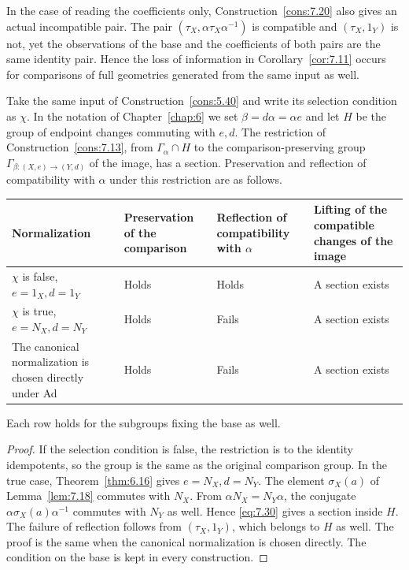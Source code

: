 In the case of reading the coefficients only, Construction~\ref{cons:7.20} also gives an
actual incompatible pair.
The pair $(\tau_X,\alpha\tau_X\alpha^{-1})$ is compatible and $(\tau_X,1_Y)$ is not, yet the
observations of the base and the coefficients of both pairs are the same identity pair.
Hence the loss of information in Corollary~\ref{cor:7.11} occurs for comparisons of full
geometries generated from the same input as well.

\begin{corollary}\label{cor:7.22}

Take the same input of Construction~\ref{cons:5.40} and write its selection condition as $\chi$.
In the notation of Chapter~\ref{chap:6} we set $\beta=d\alpha=\alpha e$ and let $H$ be the
group of endpoint changes commuting with $e,d$.
The restriction of Construction~\ref{cons:7.13}, from $\Gamma_\alpha\cap H$ to
the comparison-preserving group $\Gamma_{\beta:(X,e)\to(Y,d)}$ of the image, has a
section.
Preservation and reflection of compatibility with $\alpha$ under this restriction are as
follows.

\begin{xltabular}{\linewidth}{@{}LLLL@{}}
\toprule
Normalization & Preservation of the comparison & Reflection of compatibility with $\alpha$ &
Lifting of the compatible changes of the image \\
\midrule
\endhead
$\chi$ is false, $e=1_X,d=1_Y$ & Holds & Holds & A section exists \\
\addlinespace[3pt]
$\chi$ is true, $e=N_X,d=N_Y$ & Holds & Fails & A section exists \\
\addlinespace[3pt]
The canonical normalization is chosen directly under Ad & Holds & Fails & A section exists \\
\bottomrule
\end{xltabular}

Each row holds for the subgroups fixing the base as well.

\end{corollary}

\begin{proof}

If the selection condition is false, the restriction is to the identity idempotents, so the
group is the same as the original comparison group.
In the true case, Theorem~\ref{thm:6.16} gives $e=N_X,d=N_Y$.
The element $\sigma_X(a)$ of Lemma~\ref{lem:7.18} commutes with $N_X$.
From $\alpha N_X=N_Y\alpha$, the conjugate $\alpha\sigma_X(a)\alpha^{-1}$ commutes with
$N_Y$ as well.
Hence \eqref{eq:7.30} gives a section inside $H$.
The failure of reflection follows from $(\tau_X,1_Y)$, which belongs to $H$ as well.
The proof is the same when the canonical normalization is chosen directly. The condition on
the base is kept in every construction.

\end{proof}

